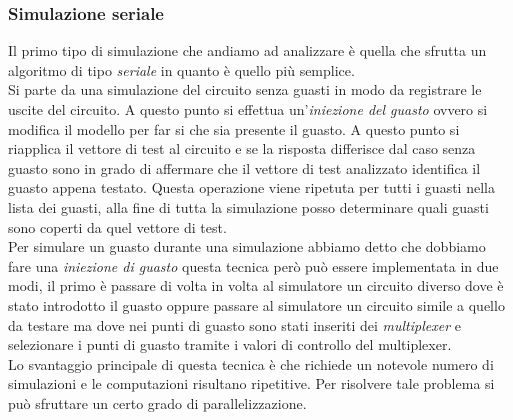 \subsubsection{Simulazione seriale}
Il primo tipo di simulazione che andiamo ad analizzare è quella che sfrutta un algoritmo di tipo \emph{seriale} in quanto è quello più semplice.\\
Si parte da una simulazione del circuito senza guasti in modo da registrare le uscite del circuito. A questo punto si effettua un'\emph{iniezione del guasto} ovvero si modifica il modello per far si che sia presente il guasto. A questo punto si riapplica il vettore di test al circuito e se la risposta differisce dal caso senza guasto sono in grado di affermare che il vettore di test analizzato identifica il guasto appena testato. Questa operazione viene ripetuta per tutti i guasti nella lista dei guasti, alla fine di tutta la simulazione posso determinare quali guasti sono coperti da quel vettore di test.\\
Per simulare un guasto durante una simulazione abbiamo detto che dobbiamo fare una \emph{iniezione di guasto} questa tecnica però può essere implementata in due modi, il primo è passare di volta in volta al simulatore un circuito diverso dove è stato introdotto il guasto oppure passare al simulatore un circuito simile a quello da testare ma dove nei punti di guasto sono stati inseriti dei \emph{multiplexer} e selezionare i punti di guasto tramite i valori di controllo del multiplexer.\\
Lo svantaggio principale di questa tecnica è che richiede un notevole numero di simulazioni e le computazioni risultano ripetitive. Per risolvere tale problema si può sfruttare un certo grado di parallelizzazione.
